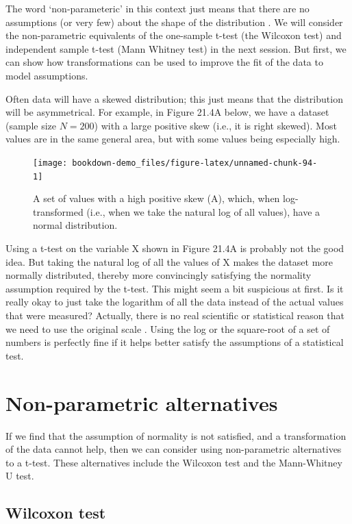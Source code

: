 \documentclass[
]{scrbook}
\begin{document}
The word `non-parameteric' in this context just means that there are no assumptions (or very few) about the shape of the distribution \citep{Dytham2011}.
We will consider the non-parametric equivalents of the one-sample t-test (the Wilcoxon test) and independent sample t-test (Mann Whitney test) in the next session.
But first, we can show how transformations can be used to improve the fit of the data to model assumptions.

Often data will have a skewed distribution; this just means that the distribution will be asymmetrical.
For example, in Figure 21.4A below, we have a dataset (sample size \(N = 200\)) with a large positive skew (i.e., it is right skewed).
Most values are in the same general area, but with some values being especially high.

\begin{figure}
\texttt{[image: bookdown-demo\_files/figure-latex/unnamed-chunk-94-1]} \caption{A set of values with a high positive skew (A), which, when log-transformed (i.e., when we take the natural log of all values), have a normal distribution.}\label{fig:unnamed-chunk-94}
\end{figure}

Using a t-test on the variable X shown in Figure 21.4A is probably not the good idea.
But taking the natural log of all the values of X makes the dataset more normally distributed, thereby more convincingly satisfying the normality assumption required by the t-test.
This might seem a bit suspicious at first.
Is it really okay to just take the logarithm of all the data instead of the actual values that were measured?
Actually, there is no real scientific or statistical reason that we need to use the original scale \citep{Sokal1995}.
Using the log or the square-root of a set of numbers is perfectly fine if it helps better satisfy the assumptions of a statistical test.

\hypertarget{non-parametric-alternatives}{%
\section{Non-parametric alternatives}\label{non-parametric-alternatives}}

If we find that the assumption of normality is not satisfied, and a transformation of the data cannot help, then we can consider using non-parametric alternatives to a t-test.
These alternatives include the Wilcoxon test and the Mann-Whitney U test.

\hypertarget{wilcoxon-test}{%
\subsection{Wilcoxon test}\label{wilcoxon-test}}
\end{document}
